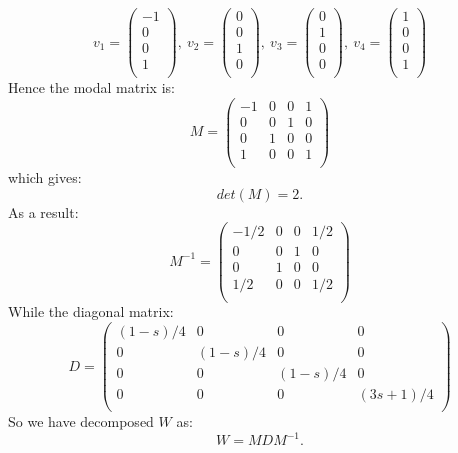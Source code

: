 \begin{equation}
v_1=\left(
\begin{array}{c}
 -1 \\
 0\\
 0\\
 1 \\
\end{array}
\right),
\:  v_2=\left(
\begin{array}{c}
 0 \\
 0\\
 1\\
 0 \\
\end{array}
\right),
\:  v_3= \left(
\begin{array}{c}
 0 \\
 1\\
 0\\
 0 \\
\end{array}
\right),\:  v_4= 
\left(
\begin{array}{c}
 1 \\
 0\\
 0\\
 1 \\
\end{array}
\right)
\end{equation}
Hence the modal matrix is:
\begin{equation}
M=\left(
\begin{array}{cccc}
 -1 & 0 & 0 & 1 \\
 0 & 0 & 1 & 0 \\
 0 & 1 & 0 & 0 \\
 1 & 0 & 0 & 1 \\
\end{array}
\right)
\end{equation}
which gives:
\begin{equation}
det(M)=2.
\end{equation}
As a result:
\begin{equation}
M^{-1}=
\left(
\begin{array}{cccc}
 -1/2 & 0 & 0 & 1/2 \\
 0 & 0 & 1 & 0 \\
 0 & 1 & 0 & 0 \\
 1/2 & 0 & 0 & 1/2 \\
\end{array}
\right)
\end{equation}
While the diagonal matrix:
\begin{equation}
D=\left(
\begin{array}{cccc}
(1-s)/4 & 0 & 0 & 0 \\
 0 & (1-s)/4 & 0 & 0 \\
 0 & 0 & (1-s)/4 & 0 \\
 0 & 0 & 0 & (3s+1)/4 \\
\end{array}
\right)
\end{equation}
So we have decomposed $W$ as:
\begin{equation}
W=MDM^{-1}.
\end{equation}


